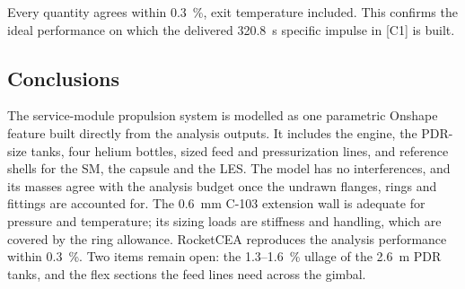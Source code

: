 \begin{table}[htbp]\centering\small\caption{Ideal vacuum performance: analysis solver [C1] against RocketCEA.}\label{cad-tab:cea}
\end{table}

Every quantity agrees within 0.3~\%, exit temperature included. This confirms the ideal performance on which the
delivered 320.8~s specific impulse in [C1] is built.

\subsection{Conclusions}
The service-module propulsion system is modelled as one parametric Onshape feature built directly from the analysis
outputs. It includes the engine, the PDR-size tanks, four helium bottles, sized feed and pressurization lines, and
reference shells for the SM, the capsule and the LES. The model has no interferences, and its masses agree with the
analysis budget once the undrawn flanges, rings and fittings are accounted for. The 0.6~mm C-103 extension wall is
adequate for pressure and temperature; its sizing loads are stiffness and handling, which are covered by the ring
allowance. RocketCEA reproduces the analysis performance within 0.3~\%. Two items remain open: the 1.3--1.6~\% ullage of
the 2.6~m PDR tanks, and the flex sections the feed lines need across the gimbal.

